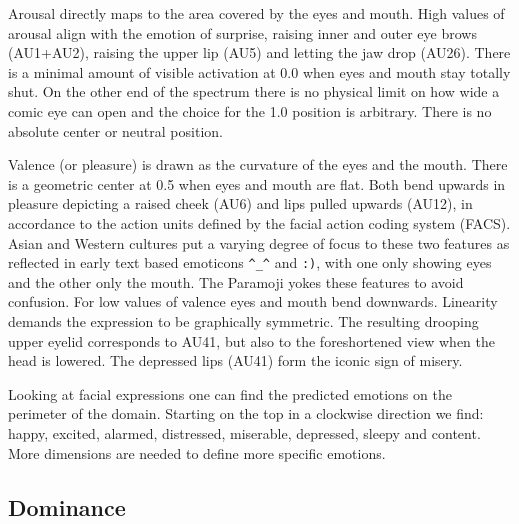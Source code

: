 Arousal directly maps to the area covered by the eyes and mouth.
High values of arousal align with the emotion of surprise, raising inner and outer eye brows (AU1+AU2), raising the upper lip (AU5)
and letting the jaw drop (AU26).
There is a minimal amount of visible activation at 0.0 when eyes and mouth stay totally shut.
On the other end of the spectrum there is no physical limit on how wide a comic eye can open and the choice for the 1.0 position is arbitrary.
There is no absolute center or neutral position.

Valence (or pleasure) is drawn as the curvature of the eyes and the mouth.
There is a geometric center at 0.5 when eyes and mouth are flat.
Both bend upwards in pleasure depicting a raised cheek (AU6) and lips pulled upwards (AU12),
in accordance to the action units defined by the facial action coding system (FACS).
Asian and Western cultures put a varying degree of focus to these two features
as reflected in early text based emoticons \texttt{\^{}\_\^} and \texttt{:)}, with one only showing eyes and the other only the mouth.
The Paramoji yokes these features to avoid confusion.
For low values of valence eyes and mouth bend downwards. Linearity demands the expression to be graphically symmetric.
The resulting drooping upper eyelid corresponds to AU41, but also to the foreshortened view when the head is lowered.
The depressed lips (AU41) form the iconic sign of misery.

Looking at facial expressions one can find the predicted emotions on the perimeter of the domain.
Starting on the top in a clockwise direction we find: happy, excited, alarmed, distressed, miserable, depressed, sleepy and content.
More dimensions are needed to define more specific emotions.


\subsection{Dominance}

